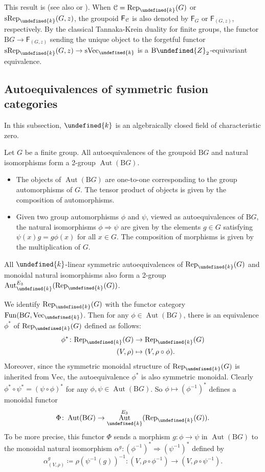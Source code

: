 \documentclass[10pt]{article}
\let\mathbb\undefined
\theoremstyle{definition}
\numberwithin{equation}{section}
\numberwithin{thm}{section}
\newcommand{\bit}{\begin{itemize}}
\newcommand{\eit}{\end{itemize}}
\newcommand{\Zb}{\mathbb{Z}}
\newcommand{\bk}{\mathbb{k}}
\newcommand{\CC}{\EuScript{C}}
\newcommand{\SF}{\mathsf{F}}
\newcommand{\rmB}{\mathrm{B}}
\DeclareMathOperator{\Aut}{Aut}
\DeclareMathOperator{\fun}{Fun}
\newcommand{\vect}{\mathrm{Vec}}
\newcommand{\svect}{\mathrm{sVec}}
\newcommand{\rep}{\mathrm{Rep}}
\newcommand{\srep}{\mathrm{sRep}}
\begin{document}
This result is \cite[Theorem 9.9.26 (ii)]{EGNO15} (see also \cite[Section 9.11]{EGNO15} or \cite[Section 6.4]{Cou20}). When $\CC = \rep_\bk(G)$ or $\srep_\bk(G,z)$, the groupoid $\SF_\CC$ is also denoted by $\SF_G$ or $\SF_{(G,z)}$, respectively. By the classical Tannaka-Krein duality for finite groups, the functor $\rmB G \to \SF_{(G,z)}$ sending the unique object to the forgetful functor $\srep_\bk(G,z) \to \svect_\bk$ is a $\rmB \Zb_2$-equivariant equivalence.

\subsection{Autoequivalences of symmetric fusion categories}

In this subsection, $\bk$ is an algebraically closed field of characteristic zero.


Let $G$ be a finite group. All autoequivalences of the groupoid $\rmB G$ and natural isomorphisms form a 2-group $\Aut(\rmB G)$.
\bit
\item The objects of $\Aut(\rmB G)$ are one-to-one corresponding to the group automorphisms of $G$. The tensor product of objects is given by the composition of automorphisms.
\item Given two group automorphisms $\phi$ and $\psi$, viewed as autoequivalences of $\mathrm B G$, the natural isomorphisms $\phi \Rightarrow \psi$ are given by the elements $g \in G$ satisfying $\psi(x) g = g \phi(x)$ for all $x \in G$. The composition of morphisms is given by the multiplication of $G$.
\eit
All $\bk$-linear symmetric autoequivalences of $\rep_\bk(G)$ and monoidal natural isomorphisms also form a 2-group $\Aut_\bk^{E_3}(\rep_\bk(G))$.

We identify $\rep_\bk(G)$ with the functor category $\fun(\rmB G,\vect_\bk)$. Then for any $\phi \in \Aut(\rmB G)$, there is an equivalence $\phi^*$ of $\rep_\bk(G)$ defined as follows:
\begin{align*}
\phi^* \colon \rep_\bk(G) & \to \rep_\bk(G) \\
(V,\rho) & \mapsto (V,\rho \circ \phi) .
\end{align*}
Moreover, since the symmetric monoidal structure of $\rep_\bk(G)$ is inherited from $\vect$, the autoequivalence $\phi^*$ is also symmetric monoidal. Clearly $\phi^* \circ \psi^* = (\psi \circ \phi)^*$ for any $\phi,\psi \in \Aut(\rmB G)$. So $\phi \mapsto (\phi^{-1})^*$ defines a monoidal functor
\[
\Phi \colon \Aut(\mathrm B G) \to \Aut_\bk^{E_3}(\rep_\bk(G)) .
\]
To be more precise, this functor $\Phi$ sends a morphism $g \colon \phi \to \psi$ in $\Aut(\mathrm B G)$ to the monoidal natural isomorphism $\alpha^g \colon (\phi^{-1})^* \Rightarrow (\psi^{-1})^*$ defined by
\[
\alpha^g_{(V,\rho)} \coloneqq \rho(\psi^{-1}(g))^{-1} \colon (V,\rho \circ \phi^{-1}) \to (V,\rho \circ \psi^{-1}) .
\]
\end{document}
